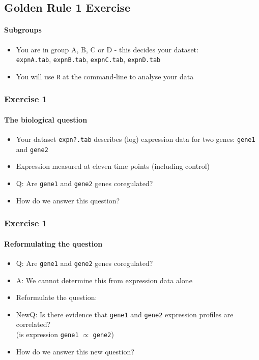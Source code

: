 %

\subsection{Golden Rule 1 Exercise}
\begin{frame}
  \framesubtitle{Subgroups}
  \begin{itemize}
    \item You are in group A, B, C or D - this decides your dataset: \\
             \texttt{expnA.tab}, \texttt{expnB.tab}, \texttt{expnC.tab}, \texttt{expnD.tab}
    \item You will use \texttt{R} at the command-line to analyse your data
  \end{itemize}
\end{frame}
  
\begin{frame}
  \frametitle{Exercise 1}
  \framesubtitle{The biological question}
  \begin{itemize}
    \item Your dataset \texttt{expn?.tab} describes (log) expression data for two genes: \texttt{gene1} and \texttt{gene2}
    \item Expression measured at eleven time points (including control)
    \item Q: Are \texttt{gene1} and \texttt{gene2} genes coregulated?
    \item How do we answer this question?
  \end{itemize}
\end{frame}  

\begin{frame}
  \frametitle{Exercise 1}
  \framesubtitle{Reformulating the question}
  \begin{itemize}
    \item<1-> Q: Are \texttt{gene1} and \texttt{gene2} genes coregulated?
    \item<1-> A: We cannot determine this from expression data alone
    \item<2-> Reformulate the question:
    \item<2-> NewQ: Is there evidence that \texttt{gene1} and \texttt{gene2} expression profiles are correlated? \\
                   (is expression \texttt{gene1} $\propto$ \texttt{gene2})
    \item<2-> How do we answer this new question?
  \end{itemize}
\end{frame}

